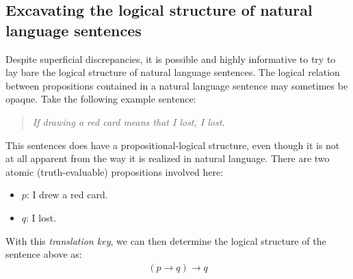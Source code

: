\documentclass[nobib,nofonts]{tufte-handout}
\begin{document}
\subsection{Excavating the logical structure of natural language sentences}

Despite superficial discrepancies, it is possible and highly informative to try to lay bare the logical structure of natural language sentences.%
The logical relation between propositions contained in a natural language sentence may sometimes be opaque.
Take the following example sentence:
\begin{quote}
  \emph{If drawing a red card means that I lost, I lost.}
\end{quote}
This sentences does have a propositional-logical structure, even though it is not at all apparent from the way it is realized in natural language.
There are two atomic (truth-evaluable) propositions involved here:
\begin{multicols}{2}
  \begin{itemize}[]
    \item $p$: I drew a red card.
    \item $q$: I lost.
  \end{itemize}
\end{multicols}
\noindent With this \emph{translation key}, we can then determine the logical structure of the sentence above as:
\begin{align*}
  (p \rightarrow q) \rightarrow q
\end{align*}
\end{document}
